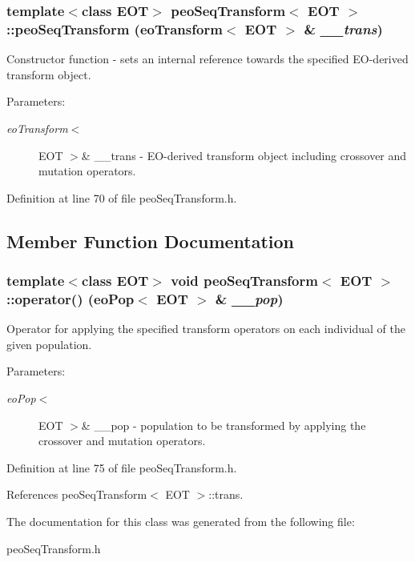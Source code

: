 \subsubsection{\setlength{\rightskip}{0pt plus 5cm}template$<$class EOT$>$ {\bf peo\-Seq\-Transform}$<$ EOT $>$::{\bf peo\-Seq\-Transform} (eo\-Transform$<$ EOT $>$ \& {\em \_\-\_\-trans})}\label{classpeo_seq_transform_3b8e4ed19d9458938eb669d83a53c626}


Constructor function - sets an internal reference towards the specified EO-derived transform object. 

\begin{Desc}
\item[Parameters:]
\begin{description}
\item[{\em eo\-Transform$<$}]EOT $>$\& \_\-\_\-trans - EO-derived transform object including crossover and mutation operators. \end{description}
\end{Desc}


Definition at line 70 of file peo\-Seq\-Transform.h.

\subsection{Member Function Documentation}
\subsubsection{\setlength{\rightskip}{0pt plus 5cm}template$<$class EOT$>$ void {\bf peo\-Seq\-Transform}$<$ EOT $>$::operator() (eo\-Pop$<$ EOT $>$ \& {\em \_\-\_\-pop})}\label{classpeo_seq_transform_1ba63536abb6c4e1c369e0b7e066872e}


Operator for applying the specified transform operators on each individual of the given population. 

\begin{Desc}
\item[Parameters:]
\begin{description}
\item[{\em eo\-Pop$<$}]EOT $>$\& \_\-\_\-pop - population to be transformed by applying the crossover and mutation operators. \end{description}
\end{Desc}


Definition at line 75 of file peo\-Seq\-Transform.h.

References peo\-Seq\-Transform$<$ EOT $>$::trans.

The documentation for this class was generated from the following file:\begin{CompactItemize}
\item 
peo\-Seq\-Transform.h\end{CompactItemize}

